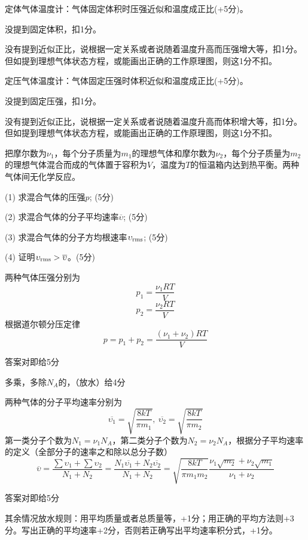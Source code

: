 \documentclass[CJK]{beamer}
\begin{document}
\begin{frame}
\bch
{\darkgreen
定体气体温度计：气体固定体积时压强近似和温度成正比(+5分)。
}
{\small
\bitem
\item{没提到固定体积，扣1分。}
\item{没有提到近似正比，说根据一定关系或者说随着温度升高而压强增大等，扣1分。但如提到理想气体状态方程，或能画出正确的工作原理图，则这1分不扣。}
\eitem
}

{\darkgreen
定压气体温度计：气体固定压强时体积近似和温度成正比(+5分)。
}

{\small
\bitem
\item{没提到固定压强，扣1分。}
\item{没有提到近似正比，说根据一定关系或者说随着温度升高而体积增大等，扣1分。但如提到理想气体状态方程，或能画出正确的工作原理图，则这1分不扣。}
\eitem
}

\ech
\end{frame}


\begin{frame}
\bch
{\blue 把摩尔数为$\nu_1$，每个分子质量为$m_1$的理想气体和摩尔数为$\nu_2$，每个分子质量为$m_2$的理想气体混合而成的气体置于容积为$V$，温度为$T$的恒温箱内达到热平衡。两种气体间无化学反应。
\bitem
\item[(1)]{\blue 求混合气体的压强$p$; (5分)}
\item[(2)]{\blue 求混合气体的分子平均速率$\overline{\upsilon}$; (5分)}
\item[(3)]{\blue 求混合气体的分子方均根速率$\upsilon_{\rm rms} $; (5分)}
\item[(4)]{\blue 证明$\upsilon_{\rm rms} > \overline{\upsilon}$。(5分)}
\eitem
}
\ech
\end{frame}

\begin{frame}
\bch
{\darkgreen
两种气体压强分别为
$$ p_1 = \frac{\nu_1 RT}{V}$$
$$ p_2 = \frac{\nu_2 RT}{V}$$
根据道尔顿分压定律
$$p = p_1+p_2 = \frac{(\nu_1+\nu_2)RT}{V}$$
}
{\small
\bitem
\item{答案对即给5分}
\item{多乘，多除$N_A$的，（放水）给4分}
\eitem
}
\ech
\end{frame}

\begin{frame}
\bch
{\darkgreen
两种气体的分子平均速率分别为
$$ \overline{\upsilon_1} =\sqrt{\frac{8kT}{\pi m_1}},\ \overline{\upsilon_2} =\sqrt{\frac{8kT}{\pi m_2}}$$
第一类分子个数为$N_1 = \nu_1 N_A$，第二类分子个数为$N_2 = \nu_2 N_A$，根据分子平均速率的定义（全部分子的速率之和除以总分子数）
$$\overline{\upsilon} = \frac{\sum \upsilon_1 + \sum \upsilon_2}{N_1+N_2} = \frac{N_1\overline{\upsilon_1}+ N_2\overline{\upsilon_2}}{N_1+N_2} = \sqrt{\frac{8kT}{\pi m_1m_2}}\frac{\nu_1\sqrt{m_2} + \nu_2\sqrt{m_1}}{\nu_1+\nu_2} $$
}
{\small
\bitem
\item{答案对即给5分}
\item{其余情况放水规则：用平均质量或者总质量等，+1分；用正确的平均方法则+3分。写出正确的平均速率+2分，否则若正确写出平均速率积分式，+1分。}
\eitem
}
\ech
\end{frame}
\end{document}
